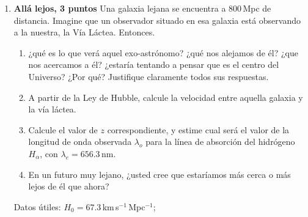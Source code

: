 \documentclass[a4paper,12pt]{article}
\begin{document}
\begin{enumerate}
	\item {\bf{Allá lejos, 3 puntos}}
		Una galaxia lejana se encuentra a $800$\,Mpc de distancia. Imagine que
		un observador situado en esa galaxia está observando a la nuestra, la
		Vía Láctea. Entonces.
		\begin{enumerate}
			\item ¿qué es lo que verá aquel exo-astrónomo? ¿qué nos alejamos de
				él?  ¿que nos acercamos a él? ¿estaría tentando a pensar que es
				el centro del Universo? ¿Por qué? Justifique claramente todos
				sus respuestas.
			\item A partir de la Ley de Hubble, calcule la velocidad entre
				aquella galaxia y la vía láctea.
			\item Calcule el valor de $z$ correspondiente, y estime cual será
				el valor de la longitud de onda observada $\lambda_o$ para la
				línea de absorción del hidrógeno $H_\alpha$, con
				$\lambda_e = 656.3$\,nm.
			\item En un futuro muy lejano, ¿usted cree que estaríamos más cerca
				o más lejos de él que ahora?
		\end{enumerate}
		Datos útiles: $H_0 = 67.3$\,km\,s$^{-1}$\,Mpc$^{-1}$;
\end{enumerate}
\end{document}
